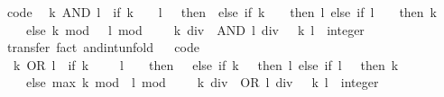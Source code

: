 \begin{isabellebody}
\ {\isacharbrackleft}{\kern0pt}code{\isacharbrackright}{\kern0pt}{\isacharcolon}{\kern0pt}\isanewline
\ \ {\isacartoucheopen}k\ AND\ l\ {\isacharequal}{\kern0pt}\ {\isacharparenleft}{\kern0pt}if\ k\ {\isacharequal}{\kern0pt}\ {}\ {\isasymor}\ l\ {\isacharequal}{\kern0pt}\ {}\ then\ {}\ else\ if\ k\ {\isacharequal}{\kern0pt}\ {\isacharminus}{\kern0pt}\ {}\ then\ l\ else\ if\ l\ {\isacharequal}{\kern0pt}\ {\isacharminus}{\kern0pt}\ {}\ then\ k\isanewline
\ \ \ \ else\ {\isacharparenleft}{\kern0pt}k\ mod\ {}{\isacharparenright}{\kern0pt}\ {\isacharasterisk}{\kern0pt}\ {\isacharparenleft}{\kern0pt}l\ mod\ {}{\isacharparenright}{\kern0pt}\ {\isacharplus}{\kern0pt}\ {}\ {\isacharasterisk}{\kern0pt}\ {\isacharparenleft}{\kern0pt}{\isacharparenleft}{\kern0pt}k\ div\ {}{\isacharparenright}{\kern0pt}\ AND\ {\isacharparenleft}{\kern0pt}l\ div\ {}{\isacharparenright}{\kern0pt}{\isacharparenright}{\kern0pt}{\isacharparenright}{\kern0pt}{\isacartoucheclose}\ \ k\ l\ {\isacharcolon}{\kern0pt}{\isacharcolon}{\kern0pt}\ integer\isanewline
%
\isadelimproof
\ \ %
\endisadelimproof
%
\isatagproof
{}\isamarkupfalse%
\ transfer\ {\isacharparenleft}{\kern0pt}fact\ and{\isacharunderscore}{\kern0pt}int{\isacharunderscore}{\kern0pt}unfold{\isacharparenright}{\kern0pt}%
\endisatagproof
{\isafoldproof}%
%
\isadelimproof
\ \isanewline
%
\endisadelimproof
\isanewline
{}\isamarkupfalse%
\ {\isacharbrackleft}{\kern0pt}code{\isacharbrackright}{\kern0pt}{\isacharcolon}{\kern0pt}\isanewline
\ \ {\isacartoucheopen}k\ OR\ l\ {\isacharequal}{\kern0pt}\ {\isacharparenleft}{\kern0pt}if\ k\ {\isacharequal}{\kern0pt}\ {\isacharminus}{\kern0pt}\ {}\ {\isasymor}\ l\ {\isacharequal}{\kern0pt}\ {\isacharminus}{\kern0pt}\ {}\ then\ {\isacharminus}{\kern0pt}\ {}\ else\ if\ k\ {\isacharequal}{\kern0pt}\ {}\ then\ l\ else\ if\ l\ {\isacharequal}{\kern0pt}\ {}\ then\ k\isanewline
\ \ \ \ else\ max\ {\isacharparenleft}{\kern0pt}k\ mod\ {}{\isacharparenright}{\kern0pt}\ {\isacharparenleft}{\kern0pt}l\ mod\ {}{\isacharparenright}{\kern0pt}\ {\isacharplus}{\kern0pt}\ {}\ {\isacharasterisk}{\kern0pt}\ {\isacharparenleft}{\kern0pt}{\isacharparenleft}{\kern0pt}k\ div\ {}{\isacharparenright}{\kern0pt}\ OR\ {\isacharparenleft}{\kern0pt}l\ div\ {}{\isacharparenright}{\kern0pt}{\isacharparenright}{\kern0pt}{\isacharparenright}{\kern0pt}{\isacartoucheclose}\ \ k\ l\ {\isacharcolon}{\kern0pt}{\isacharcolon}{\kern0pt}\ integer\isanewline

\end{isabellebody}

